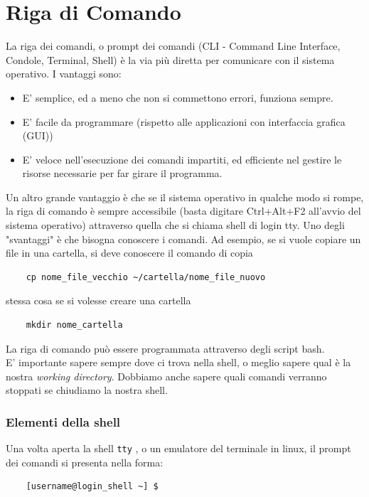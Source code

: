 \documentclass[11pt]{book}
\begin{document}
\chapter{Riga di Comando}
La riga dei comandi, o prompt dei comandi (CLI - Command Line Interface, Condole, Terminal, Shell) è la via più diretta per comunicare con il sistema operativo. I vantaggi sono:
\begin{itemize}
	\item E' semplice, ed a meno che non si commettono errori, funziona sempre.
	\item E' facile da programmare (rispetto alle applicazioni con interfaccia grafica (GUI))
	\item E' veloce nell'esecuzione dei comandi impartiti, ed efficiente nel gestire le risorse necessarie per far girare il programma.
\end{itemize}
Un altro grande vantaggio è che se il sistema operativo in qualche modo si rompe, la riga di comando è sempre accessibile (basta digitare Ctrl+Alt+F2 all'avvio del sistema operativo) attraverso quella che si chiama shell di login tty. Uno degli "svantaggi" è che bisogna conoscere i comandi. 
Ad esempio, se si vuole copiare un file in una cartella, si deve conoscere il comando di copia

\begin{verbatim}
 	cp nome_file_vecchio ~/cartella/nome_file_nuovo
\end{verbatim}
stessa cosa se si volesse creare una cartella

\begin{verbatim}
	mkdir nome_cartella
\end{verbatim}

La riga di comando può essere programmata attraverso degli script bash.\\
E' importante sapere sempre dove ci trova nella shell, o meglio sapere qual è la nostra \textit{working directory}. Dobbiamo anche sapere quali comandi verranno stoppati se chiudiamo la nostra shell.

\subsection{Elementi della shell}
Una volta aperta la shell \verb"tty"
, o un emulatore del terminale in linux, il prompt dei comandi si presenta nella forma:

\begin{verbatim}
	[username@login_shell ~] $
\end{verbatim}
\end{document}
